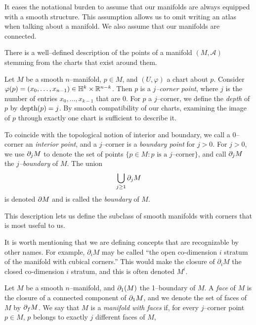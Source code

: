 It eases the notational burden to assume that our manifolds are always equipped with a smooth structure.
This assumption allows us to omit writing an atlas when talking about a manifold.
We also assume that our manifolds are connected.

There is a well--defined description of the points of a manifold $(M,\mathcal{A})$ stemming from the charts that exist around them.

\begin{defn}
	Let $M$ be a smooth $n$--manifold, $p\in M$, and $(U,\varphi)$ a chart about $p$.
	Consider $\varphi(p)=(x_0,\dots,x_{n-1})\in \mathbb{H}^k\times\mathbb{R}^{n-k}$.
	Then $p$ is a \emph{$j$--corner point}, where $j$ is the number of entries $x_0,\dots,x_{k-1}$ that are 0.
	For $p$ a $j$--corner, we define the \emph{depth} of $p$ by ${\textrm{depth}(p)}=j$.
	By smooth compatibility of our charts, examining the image of $p$ through exactly one chart is sufficient to describe it.
	
	To coincide with the topological notion of interior and boundary, we call a $0$--corner an \emph{interior point}, and a $j$--corner is a \emph{boundary point} for $j>0$.
	For $j>0$, we use $\partial_j M$ to denote the set of points $\{p\in M:p\textrm{ is a }j\textrm{--corner}\}$, and call $\partial_j M$ the \emph{$j$--boundary} of $M$.
	The union $$\bigcup_{j\geq 1} \partial_j M$$ is denoted $\partial M$ and is called the \emph{boundary} of $M$.
\end{defn}	

This description lets us define the subclass of smooth manifolds with corners that is most useful to us.

\begin{rmk}
	It is worth mentioning that we are defining concepts that are recognizable by other names.
	For example, $\partial_i M$ may be called ``the open co-dimension $i$ stratum of the manifold with cubical corners.''
	This would make the closure of $\partial_i M$ the closed co-dimension $i$ stratum, and this is often denoted $M^i$.
\end{rmk}

\begin{defn}
	Let $M$ be a smooth $n$--manifold, and $\partial_1(M)$ the 1--boundary of $M$.
	A \emph{face} of $M$ is the closure of a connected component of $\partial_1 M$, and we denote the set of faces of $M$ by $\partial_f M$.
	We say that $M$ is a \emph{manifold with faces} if, for every $j$--corner point $p\in M$, $p$ belongs to exactly $j$ different faces of $M$,
\end{defn}

